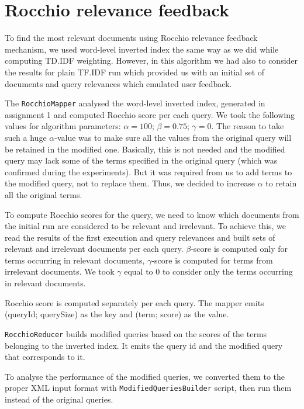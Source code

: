 \documentclass[a4paper, notitlepage]{article}
\begin{document}
%

\section{Rocchio relevance feedback}

To find the most relevant documents using Rocchio relevance feedback mechanism, we used word-level inverted index the same way as we did while computing TD.IDF weighting. However, in this algorithm we had also to consider the results for plain TF.IDF run which provided us with an initial set of documents and query relevances which emulated user feedback.

The \lstinline{RocchioMapper} analysed the word-level inverted index, generated in assignment 1 and computed Rocchio score per each query. We took the following values for algorithm parameters: $\alpha=100$; $\beta=0.75$; $\gamma=0$. The reason to take such a huge $\alpha$-value was to make sure all the values from the original query will be retained in the modified one. Basically, this is not needed and the modified query may lack some of the terms specified in the original query (which was confirmed during the experiments). But it was required from us to add terms to the modified query, not to replace them. Thus, we decided to increase $\alpha$ to retain all the original terms.

To compute Rocchio scores for the query, we need to know which documents from the initial run are considered to be relevant and irrelevant. To achieve this, we read the results of the first execution and query relevances and built sets of relevant and irrelevant documents per each query. $\beta$-score is computed only for terms occurring in relevant documents, $\gamma$-score is computed for terms from irrelevant documents. We took $\gamma$ equal to 0 to consider only the terms occurring in relevant documents.

Rocchio score is computed separately per each query. The mapper emits (queryId; querySize) as the key and (term; score) as the value.

\lstinline{RocchioReducer} builds modified queries based on the scores of the terms belonging to the inverted index. It emits the query id and the modified query that corresponds to it.

To analyse the performance of the modified queries, we converted them to the proper XML input format with \lstinline{ModifiedQueriesBuilder} script, then run them instead of the original queries.
\end{document}

